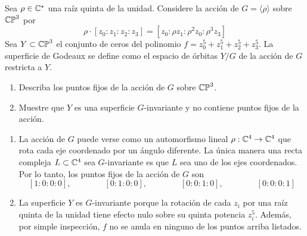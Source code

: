 \begin{exercise}
Sea $\rho \in \mathbb C^\star$ una raíz quinta de la unidad. Considere la acción de $G = \langle \rho \rangle$ sobre $\mathbb {CP}^3$ por
$$\rho \cdot [z_0 : z_1 : z_2 : z_3] = [z_0 : \rho z_1 : \rho^2 z_0 : \rho^3 z_3]$$
Sea $Y \subset \mathbb {CP}^3$ el conjunto de ceros del polinomio $f = z_0^5 + z_1^5 + z_2^5 + z_3^5$. La superficie de Godeaux se define como el espacio de órbitas $Y/G$ de la acción de $G$ restricta a $Y$.

\begin{enumerate}[label=\alph*)]
    \item Describa los puntos fijos de la acción de $G$ sobre $\mathbb {CP}^3$.
    \item Muestre que $Y$ es una superficie $G$-invariante y no contiene puntos fijos de la acción.
\end{enumerate}
\end{exercise}

\begin{solution}
\leavevmode
\begin{enumerate}[label=\alph*)]
    \item La acción de $G$ puede verse como un automorfismo lineal $\rho : \mathbb C^4 \to \mathbb C^4$ que rota cada eje coordenado por un ángulo diferente. La única manera una recta compleja $L \subset \mathbb C^4$ sea $G$-invariante es que $L$ sea uno de los ejes coordenados. Por lo tanto, los puntos fijos de la acción de $G$ son
    $$[1:0:0:0], \qquad \qquad [0:1:0:0], \qquad \qquad [0:0:1:0], \qquad \qquad [0:0:0:1]$$
    
    \item La superficie $Y$ es $G$-invariante porque la rotación de cada $z_i$ por una raíz quinta de la unidad tiene efecto nulo sobre su quinta potencia $z_i^5$. Además, por simple inspección, $f$ no se anula en ninguno de los puntos arriba listados.
\end{enumerate}
\end{solution}
